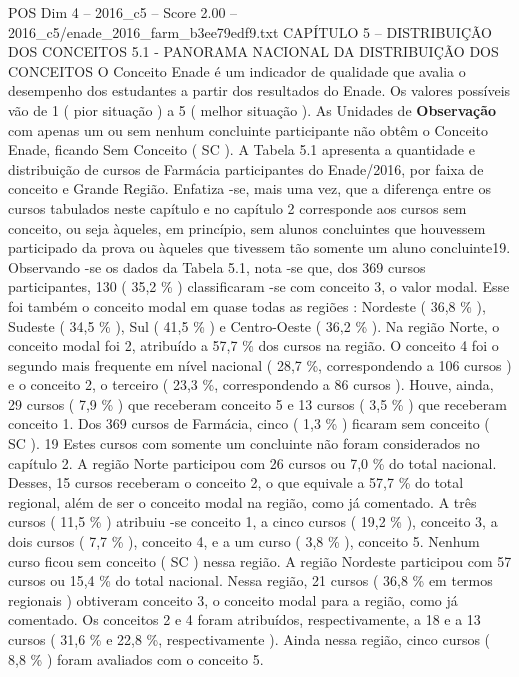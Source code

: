 \begin{textsample}{POS Dim 4 – 2016\_c5 – Score 2.00 – 2016\_c5/enade\_2016\_farm\_b3ee79edf9.txt}  \label{ex:f4_pos_104}
CAPÍTULO 5 – DISTRIBUIÇÃO DOS CONCEITOS 5.1 - PANORAMA NACIONAL DA DISTRIBUIÇÃO DOS CONCEITOS O Conceito Enade é um indicador de qualidade que avalia o desempenho dos estudantes a partir dos resultados do Enade.
Os valores possíveis vão de 1 ( pior situação ) a 5 ( melhor situação ).
As Unidades de \textbf{Observação} com apenas um ou sem nenhum concluinte participante não obtêm o Conceito Enade, ficando Sem Conceito ( SC ).
A Tabela 5.1 apresenta a quantidade e distribuição de cursos de Farmácia participantes do Enade/2016, por faixa de conceito e Grande Região.
Enfatiza -se, mais uma vez, que a diferença entre os cursos tabulados neste capítulo e no capítulo 2 corresponde aos cursos sem conceito, ou seja àqueles, em princípio, sem alunos concluintes que houvessem participado da prova ou àqueles que tivessem tão somente um aluno concluinte19.
Observando -se os dados da Tabela 5.1, nota -se que, dos 369 cursos participantes, 130 ( 35,2 \% ) classificaram -se com conceito 3, o valor modal.
Esse foi também o conceito modal em quase todas as regiões : Nordeste ( 36,8 \% ), Sudeste ( 34,5 \% ), Sul ( 41,5 \% ) e Centro-Oeste ( 36,2 \% ).
Na região Norte, o conceito modal foi 2, atribuído a 57,7 \% dos cursos na região.
O conceito 4 foi o segundo mais frequente em nível nacional ( 28,7 \%, correspondendo a 106 cursos ) e o conceito 2, o terceiro ( 23,3 \%, correspondendo a 86 cursos ).
Houve, ainda, 29 cursos ( 7,9 \% ) que receberam conceito 5 e 13 cursos ( 3,5 \% ) que receberam conceito 1.
Dos 369 cursos de Farmácia, cinco ( 1,3 \% ) ficaram sem conceito ( SC ). 19 Estes cursos com somente um concluinte não foram considerados no capítulo 2.
A região Norte participou com 26 cursos ou 7,0 \% do total nacional.
Desses, 15 cursos receberam o conceito 2, o que equivale a 57,7 \% do total regional, além de ser o conceito modal na região, como já comentado.
A três cursos ( 11,5 \% ) atribuiu -se conceito 1, a cinco cursos ( 19,2 \% ), conceito 3, a dois cursos ( 7,7 \% ), conceito 4, e a um curso ( 3,8 \% ), conceito 5.
Nenhum curso ficou sem conceito ( SC ) nessa região.
A região Nordeste participou com 57 cursos ou 15,4 \% do total nacional.
Nessa região, 21 cursos ( 36,8 \% em termos regionais ) obtiveram conceito 3, o conceito modal para a região, como já comentado.
Os conceitos 2 e 4 foram atribuídos, respectivamente, a 18 e a 13 cursos ( 31,6 \% e 22,8 \%, respectivamente ).
Ainda nessa região, cinco cursos ( 8,8 \% ) foram avaliados com o conceito 5.

\end{textsample}
